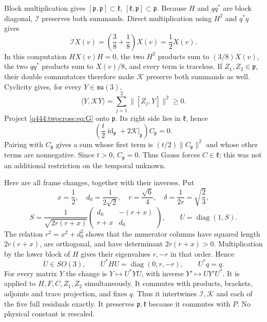 Block multiplication gives
$[\mathfrak p,\mathfrak p]\subset\mathfrak k$, $[\mathfrak k,\mathfrak p]\subset\mathfrak p$.
Because $H$ and $qq^*$ are block diagonal, $\mathcal I$ preserves
both summands. Direct multiplication using $H^2$ and $q^*q$ gives
\begin{equation}
\mathcal IX(v)=\left(\frac38+\frac18\right)X(v)=\frac12X(v).
\label{q444:twocross:eq:Ip}
\end{equation}
In this computation $HX(v)H=0$, the two $H^2$ products sum to
$(3/8)X(v)$, the two $qq^*$ products sum to $X(v)/8$, and every
term is traceless. If $Z_1,Z_2\in\mathfrak p$, their double commutators
therefore make $\mathcal K$ preserve both summands as well.
Cyclicity gives, for every $Y\in\mathfrak{su}(3)$,
\[
\langle Y,\mathcal KY\rangle=\sum_{j=1}^2\|[Z_j,Y]\|^2\ge0.
\]
Project \eqref{q444:twocross:eq:G} onto $\mathfrak p$. Its right side lies in $\mathfrak k$, hence
\[
\left(\frac t2\operatorname{id}_{\mathfrak p}+2\mathcal K|_{\mathfrak p}\right)C_{\mathfrak p}=0.
\]
Pairing with $C_{\mathfrak p}$ gives a sum whose first term is
$(t/2)\|C_{\mathfrak p}\|^2$ and whose other terms are nonnegative.
Since $t>0$, $C_{\mathfrak p}=0$. Thus Gauss forces $C\in\mathfrak k$; this was
not an additional restriction on the temporal unknown.

Here are all frame changes, together with their inverses. Put
\[
x=\frac12,\quad d_0=\frac1{2\sqrt2},\quad r=\frac{\sqrt6}{4},
\quad \delta=\frac1{2r}=\sqrt{\frac23},
\]
\[
S=\frac1{\sqrt{2r(r+x)}}
\begin{pmatrix}d_0&-(r+x)\\r+x&d_0\end{pmatrix},\qquad
U=\operatorname{diag}(1,S).
\]
The relation $r^2=x^2+d_0^2$ shows that the numerator columns have
squared length $2r(r+x)$, are orthogonal, and have determinant
$2r(r+x)>0$. Multiplication by the lower block of $H$ gives their
eigenvalues $r,-r$ in that order. Hence
\[
U\in SO(3),\qquad U^*HU=\operatorname{diag}(0,r,-r),\qquad U^*q=q.
\]
For every matrix $Y$ the change is $Y\mapsto U^*YU$, with inverse
$Y'\mapsto UY'U^*$. It is applied to $H,F,C,Z_1,Z_2$ simultaneously.
It commutes with products, brackets, adjoints and trace projection,
and fixes $q$. Thus it intertwines $\mathcal I,\mathcal K$ and each
of the five full residuals exactly. It preserves $\mathfrak p,\mathfrak k$ because
it commutes with $P$. No physical constant is rescaled.

